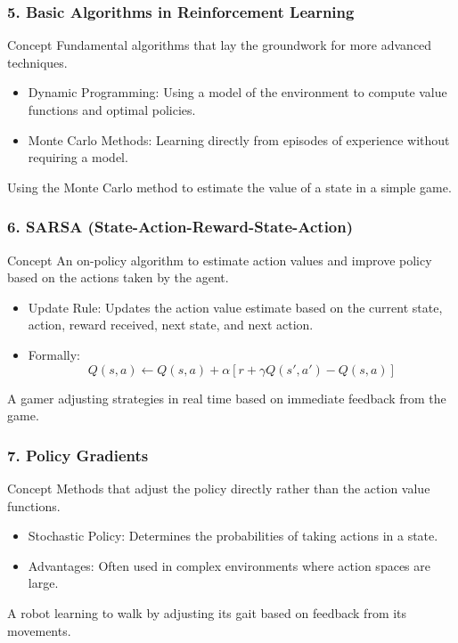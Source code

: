 \documentclass{beamer}
\begin{document}
\begin{frame}[fragile]
    \frametitle{5. Basic Algorithms in Reinforcement Learning}
    \begin{block}{Concept}
        Fundamental algorithms that lay the groundwork for more advanced techniques.
    \end{block}
    \begin{itemize}
        \item Dynamic Programming: Using a model of the environment to compute value functions and optimal policies.
        \item Monte Carlo Methods: Learning directly from episodes of experience without requiring a model.
    \end{itemize}
    \begin{example}
        Using the Monte Carlo method to estimate the value of a state in a simple game.
    \end{example}
\end{frame}

\begin{frame}[fragile]
    \frametitle{6. SARSA (State-Action-Reward-State-Action)}
    \begin{block}{Concept}
        An on-policy algorithm to estimate action values and improve policy based on the actions taken by the agent.
    \end{block}
    \begin{itemize}
        \item Update Rule: Updates the action value estimate based on the current state, action, reward received, next state, and next action.
        \item Formally:
        \begin{equation}
            Q(s,a) \leftarrow Q(s,a) + \alpha \left[ r + \gamma Q(s', a') - Q(s,a) \right]
        \end{equation}
    \end{itemize}
    \begin{example}
        A gamer adjusting strategies in real time based on immediate feedback from the game.
    \end{example}
\end{frame}

\begin{frame}[fragile]
    \frametitle{7. Policy Gradients}
    \begin{block}{Concept}
        Methods that adjust the policy directly rather than the action value functions.
    \end{block}
    \begin{itemize}
        \item Stochastic Policy: Determines the probabilities of taking actions in a state.
        \item Advantages: Often used in complex environments where action spaces are large.
    \end{itemize}
    \begin{example}
        A robot learning to walk by adjusting its gait based on feedback from its movements.
    \end{example}
\end{frame}
\end{document}
